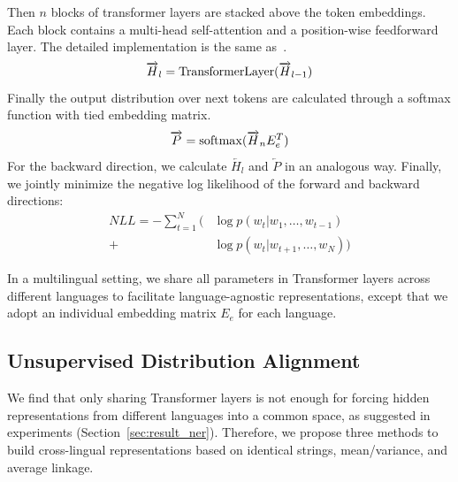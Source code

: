\documentclass[11pt,a4paper]{article}
\begin{document}
	Then $n$ blocks of transformer layers are stacked above the token embeddings. Each block contains a multi-head self-attention and a position-wise feedforward layer. The detailed implementation is the same as~\cite{vaswani2017attention}.
	\begin{equation} \label{eq:transformer_layer}
	\overrightarrow{H}_l = {\rm TransformerLayer}(\overrightarrow{H}_{l-1})%
	\end{equation}
	Finally the output distribution over next tokens are calculated through a softmax function with tied embedding matrix.
	\begin{equation}
	\overrightarrow{P} = {\rm softmax}(\overrightarrow{H}_n E_e^T)
	\end{equation}
	For the backward direction, we calculate $\overleftarrow{H_l}$ and $\overleftarrow{P}$ in an analogous way. Finally, we jointly minimize the negative log likelihood of the forward and backward directions:
	\begin{equation} \label{eq:NLL}
	\begin{aligned} 
	NLL = - \sum_{t=1}^N (&\log p(w_t | w_1, \ldots, w_{t-1}) \\
	+ &\log p(w_t | w_{t+1}, \ldots, w_{N}))
	\end{aligned}
	\end{equation}
	
	In a multilingual setting, we share all parameters in Transformer layers across different languages to facilitate language-agnostic representations, except that we adopt an individual embedding matrix $E_e$ for each language.
	
	\subsection{Unsupervised Distribution Alignment}
	
	We find that only sharing Transformer layers is not enough for forcing hidden representations from different languages into a common space, as suggested in experiments (Section~\ref{sec:result_ner}). Therefore, we propose three methods to build cross-lingual representations based on identical strings, mean/variance, and average linkage.
	
\end{document}
